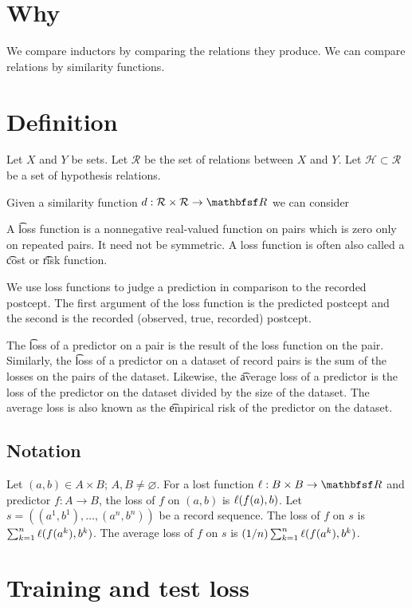 
\section*{Why}

We compare inductors by comparing the relations they produce.
We can compare relations by similarity functions.

\section*{Definition}

Let $X$ and $Y$ be sets.
Let $\mathcal{R} $ be the set of relations between $X$ and $Y$.
Let $\mathcal{H}  \subset \mathcal{R} $ be a set of hypothesis relations.

Given a similarity function $d: \mathcal{R}  \times  \mathcal{R} \to \R $ we can consider

A \t{loss} function is a nonnegative real-valued function on pairs which is zero only on repeated pairs.
It need not be symmetric.
A loss function is often also called a \t{cost} or \t{risk} function.

We use loss functions to judge a prediction in comparison to the recorded postcept.
The first argument of the loss function is the predicted postcept and the second is the recorded (observed, true, recorded) postcept.

The \t{loss of a predictor on a pair} is the result of the loss function on the pair.
Similarly, the \t{loss of a predictor on a dataset} of record pairs is the sum of the losses on the pairs of the dataset.
Likewise, the \t{average loss} of a predictor is the loss of the predictor on the dataset divided by the size of the dataset.
The average loss is also known as the \t{empirical risk} of the predictor on the dataset.

\subsection*{Notation}

Let $(a, b) \in A \times B$; $A, B \neq \varnothing$.
For a lost function $\loss: B \cross B \to \R $ and predictor $f: A \to B$, the loss of $f$ on $(a, b)$ is $\ell(f(a),b)$.
Let $s = ((a^1, b^1), \dots , (a^n, b^n))$
be a record sequence.
The loss of $f$ on $s$ is $\sum_{k = 1}^{n} \ell(f(a^k), b^k)$.
The average loss of $f$ on $s$ is $(1/n)\sum_{k = 1}^{n} \ell(f(a^k), b^k)$.

\section*{Training and test loss}

